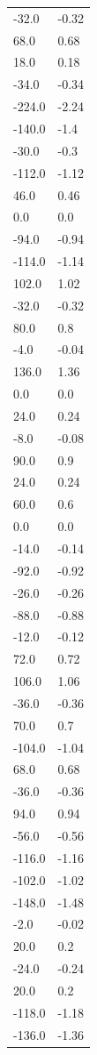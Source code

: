 \begin{longtable}{ll}
-32.0 & -0.32 \\
68.0 & 0.68 \\
18.0 & 0.18 \\
-34.0 & -0.34 \\
-224.0 & -2.24 \\
-140.0 & -1.4 \\
-30.0 & -0.3 \\
-112.0 & -1.12 \\
46.0 & 0.46 \\
0.0 & 0.0 \\
-94.0 & -0.94 \\
-114.0 & -1.14 \\
102.0 & 1.02 \\
-32.0 & -0.32 \\
80.0 & 0.8 \\
-4.0 & -0.04 \\
136.0 & 1.36 \\
0.0 & 0.0 \\
24.0 & 0.24 \\
-8.0 & -0.08 \\
90.0 & 0.9 \\
24.0 & 0.24 \\
60.0 & 0.6 \\
0.0 & 0.0 \\
-14.0 & -0.14 \\
-92.0 & -0.92 \\
-26.0 & -0.26 \\
-88.0 & -0.88 \\
-12.0 & -0.12 \\
72.0 & 0.72 \\
106.0 & 1.06 \\
-36.0 & -0.36 \\
70.0 & 0.7 \\
-104.0 & -1.04 \\
68.0 & 0.68 \\
-36.0 & -0.36 \\
94.0 & 0.94 \\
-56.0 & -0.56 \\
-116.0 & -1.16 \\
-102.0 & -1.02 \\
-148.0 & -1.48 \\
-2.0 & -0.02 \\
20.0 & 0.2 \\
-24.0 & -0.24 \\
20.0 & 0.2 \\
-118.0 & -1.18 \\
-136.0 & -1.36 \\

\end{longtable}
